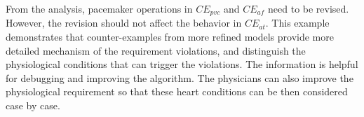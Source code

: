 From the analysis, pacemaker operations in $CE_{pvc}$ and $CE_{af}$ need to be revised. However, the revision should not affect the behavior in $CE_{at}$. This example demonstrates that counter-examples from more refined models provide more detailed mechanism of the requirement violations, and distinguish the physiological conditions that can trigger the violations. The information is helpful for debugging and improving the algorithm. The physicians can also improve the physiological requirement so that these heart conditions can be then considered case by case. %
%
 




